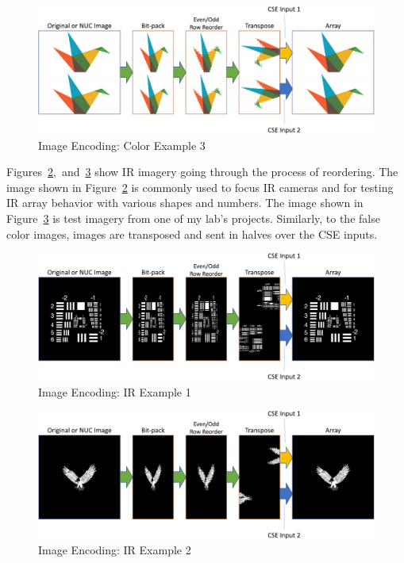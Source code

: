     \begin{figure}
        \centering
        \includegraphics[width=1.0\textwidth]{fig/image_encoding_origami.pdf}
        \caption{Image Encoding: Color Example 3}
        \label{fig:image_encoding_color_example3}
    \end{figure}

    Figures~\ref{fig:image_encoding_ir_example1},~and~\ref{fig:image_encoding_ir_example2} show IR imagery going through the process of reordering. The image shown in Figure~\ref{fig:image_encoding_ir_example1} is commonly used to focus IR cameras and for testing IR array behavior with various shapes and numbers. The image shown in Figure~\ref{fig:image_encoding_ir_example2} is test imagery from one of my lab's projects. Similarly, to the false color images, images are transposed and sent in halves over the CSE inputs.

    \begin{figure}
        \centering
        \includegraphics[width=1.0\textwidth]{fig/image_encoding_ir1.pdf}
        \caption{Image Encoding: IR Example 1}
        \label{fig:image_encoding_ir_example1}
    \end{figure}

    \begin{figure}
        \centering
        \includegraphics[width=1.0\textwidth]{fig/image_encoding_ir2.pdf}
        \caption{Image Encoding: IR Example 2}
        \label{fig:image_encoding_ir_example2}
    \end{figure}

